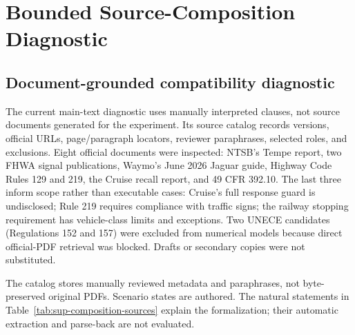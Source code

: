 \documentclass[10pt]{article}
\begin{document}
\section{Bounded Source-Composition Diagnostic}\label{sup:composition}


\subsection*{Document-grounded compatibility diagnostic}

The current main-text diagnostic uses manually interpreted clauses, not
source documents generated for the experiment. Its source catalog records
versions, official URLs, page/paragraph locators, reviewer paraphrases,
selected roles, and exclusions. Eight official documents were inspected:
NTSB's Tempe report, two FHWA signal publications, Waymo's June 2026 Jaguar
guide, Highway Code Rules 129 and 219, the Cruise recall report, and
49 CFR 392.10. The last three inform scope rather than executable cases:
Cruise's full response guard is undisclosed; Rule 219 requires compliance
with traffic signs; the railway stopping requirement has vehicle-class
limits and exceptions. Two UNECE candidates (Regulations 152 and 157) were
excluded from numerical models because direct official-PDF retrieval was
blocked. Drafts or secondary copies were not substituted.

The catalog stores manually reviewed metadata and paraphrases, not
byte-preserved original PDFs. Scenario states are authored. The natural
statements in Table~\ref{tab:sup-composition-sources} explain the
formalization; their automatic extraction and parse-back are not evaluated.
\end{document}

